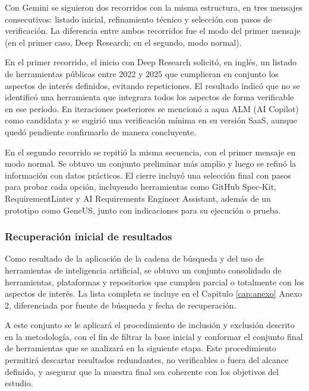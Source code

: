 Con Gemini se siguieron dos recorridos con la misma estructura, en tres mensajes consecutivos: listado inicial, refinamiento técnico y selección con pasos de verificación. La diferencia entre ambos recorridos fue el modo del primer mensaje (en el primer caso, Deep Research; en el segundo, modo normal).

En el primer recorrido, el inicio con Deep Research solicitó, en inglés, un listado de herramientas públicas entre 2022 y 2025 que cumplieran en conjunto los aspectos de interés definidos, evitando repeticiones. El resultado indicó que no se identificó una herramienta que integrara todos los aspectos de forma verificable en ese período. En iteraciones posteriores se mencionó a aqua ALM (AI Copilot) como candidata y se sugirió una verificación mínima en su versión SaaS, aunque quedó pendiente confirmarlo de manera concluyente.

En el segundo recorrido se repitió la misma secuencia, con el primer mensaje en modo normal. Se obtuvo un conjunto preliminar más amplio y luego se refinó la información con datos prácticos. El cierre incluyó una selección final con pasos para probar cada opción, incluyendo herramientas como GitHub Spec-Kit, RequirementLinter y AI Requirements Engineer Assistant, además de un prototipo como GeneUS, junto con indicaciones para su ejecución o prueba.

\subsubsection{Recuperación inicial de resultados}
Como resultado de la aplicación de la cadena de búsqueda y del uso de herramientas de inteligencia artificial, se obtuvo un conjunto consolidado de herramientas, plataformas y repositorios que cumplen parcial o totalmente con los aspectos de interés. La lista completa se incluye en el Capitulo \ref{cap:anexo} Anexo 2, diferenciada por fuente de búsqueda y fecha de recuperación.

A este conjunto se le aplicará el procedimiento de inclusión y exclusión descrito en la metodología, con el fin de filtrar la base inicial y conformar el conjunto final de herramientas que se analizará en la siguiente etapa. Este procedimiento permitirá descartar resultados redundantes, no verificables o fuera del alcance definido, y asegurar que la muestra final sea coherente con los objetivos del estudio.

